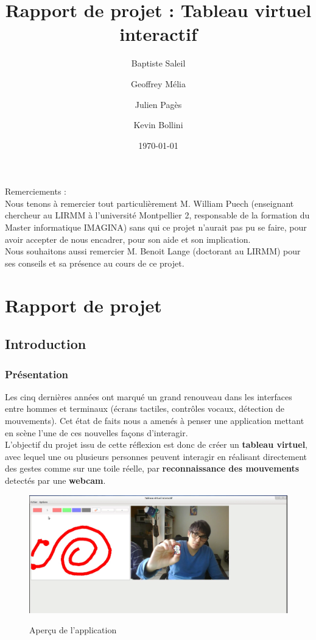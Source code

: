 \documentclass{report}
\title{Rapport de projet : Tableau virtuel interactif}
\author{Baptiste Saleil \and Geoffrey Mélia \and Julien Pagès \and Kevin Bollini}
\date{\today}
\begin{document}
	\maketitle
	\thispagestyle{empty}
	\newpage
	
	\tableofcontents

	\listoffigures
	
	\newpage
	Remerciements : \\
	
	Nous tenons à remercier tout particulièrement M. William Puech (enseignant chercheur au LIRMM à l'université Montpellier 2, responsable de la formation du Master informatique IMAGINA) sans qui ce projet n'aurait pas pu se faire, pour avoir accepter de nous encadrer, pour son aide et son implication.\\
	Nous souhaitons aussi remercier M. Benoit Lange (doctorant au LIRMM) pour ses conseils et sa présence au cours de ce projet. \\
	\part{Rapport de projet}
	\newpage
	\chapter{Introduction}
		\section{Présentation}		
		Les cinq dernières années ont marqué un grand renouveau dans les interfaces entre hommes et terminaux (écrans tactiles, contrôles vocaux, détection de mouvements). Cet état de faits nous a amenés à penser une application mettant en scène l'une de ces nouvelles façons d'interagir.\\

		 L'objectif du projet issu de cette réflexion est donc de créer un \textbf{tableau virtuel}, avec lequel une ou plusieurs personnes peuvent interagir en réalisant directement des gestes comme sur une toile réelle, par \textbf{reconnaissance des mouvements} detectés par une \textbf{webcam}. \\
		\begin{figure}[!h]
			\centering
			\includegraphics[scale=0.3]{../images/capture-intro.png}\\
			\caption{Aperçu de l'application}
			\label{Aperçu de l'application}
		\end{figure}
	\newpage
\end{document}
